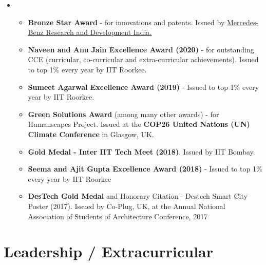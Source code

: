 \documentclass[letterpaper,11pt]{article}
\newcommand{\resumeItem}[1]{
  \item\small{
    {#1 \vspace{-2pt}}
  }
}
\newcommand{\resumeSubHeadingListStart}{\begin{itemize}[leftmargin=0.0in, label={}]}
\newcommand{\resumeSubHeadingListEnd}{\end{itemize}}
\newcommand{\resumeItemListStart}{\begin{itemize}}
\newcommand{\resumeItemListEnd}{\end{itemize}\vspace{-5pt}}
\begin{document}
    \resumeSubHeadingListStart
    \item
      \resumeItemListStart
         \resumeItem{\textbf{Bronze Star Award} - for innovations and patents. Issued by \underline{Mercedes-Benz Research and Development India.}}
         \resumeItem{\textbf{Naveen and Anu Jain Excellence Award (2020)} - for outstanding CCE (curricular, co-curricular and extra-curricular achievements). Issued to top 1\% every year by IIT Roorkee.}
         \resumeItem{\textbf{Sumeet Agarwal Excellence Award (2019)} -  Issued to top 1\% every year by IIT Roorkee.}
         \resumeItem{\textbf{Green Solutions Award} (among many other awards) - for Humanscapes Project. \newline Issued at the \textbf{COP26 United Nations (UN) Climate Conference} in Glasgow, UK.}
         \resumeItem{\textbf{Gold Medal - Inter IIT Tech Meet (2018)}. Issued by IIT Bombay.}
         \resumeItem{\textbf{Seema and Ajit Gupta Excellence Award  (2018)} - Issued to top 1\% every year by IIT Roorkee}
         \resumeItem{\textbf{DesTech Gold Medal} and Honorary Citation - Destech Smart City Poster (2017). Issued by Co-Plug, UK, at the Annual National Association of Students of Architecture Conference, 2017}
      \resumeItemListEnd
    \resumeSubHeadingListEnd


 \vspace{-8pt}
%

    
          



\section{Leadership / Extracurricular}
    
\end{document}
